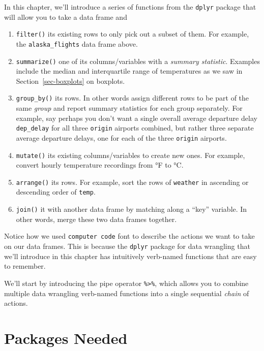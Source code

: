 \documentclass[
  letterpaper,
  DIV=11,
  numbers=noendperiod]{scrreprt}
\theoremstyle{definition}
\theoremstyle{remark}
\begin{document}
In this chapter, we'll introduce a series of functions from the
\texttt{dplyr} package that will allow you to take a data frame and

\begin{enumerate}
\def\labelenumi{\arabic{enumi}.}
\item
  \texttt{filter()} its existing rows to only pick out a subset of them.
  For example, the \texttt{alaska\_flights} data frame above.
\item
  \texttt{summarize()} one of its columns/variables with a \emph{summary
  statistic}. Examples include the median and interquartile range of
  temperatures as we saw in Section~\ref{sec-boxplots} on boxplots.
\item
  \texttt{group\_by()} its rows. In other words assign different rows to
  be part of the same \emph{group} and report summary statistics for
  each group separately. For example, say perhaps you don't want a
  single overall average departure delay \texttt{dep\_delay} for all
  three \texttt{origin} airports combined, but rather three separate
  average departure delays, one for each of the three \texttt{origin}
  airports.
\item
  \texttt{mutate()} its existing columns/variables to create new ones.
  For example, convert hourly temperature recordings from °F to °C.
\item
  \texttt{arrange()} its rows. For example, sort the rows of
  \texttt{weather} in ascending or descending order of \texttt{temp}.
\item
  \texttt{join()} it with another data frame by matching along a ``key''
  variable. In other words, merge these two data frames together.
\end{enumerate}

Notice how we used \texttt{computer\ code} font to describe the actions
we want to take on our data frames. This is because the \texttt{dplyr}
package for data wrangling that we'll introduce in this chapter has
intuitively verb-named functions that are easy to remember.

We'll start by introducing the pipe operator
\texttt{\%\textgreater{}\%}, which allows you to combine multiple data
wrangling verb-named functions into a single sequential \emph{chain} of
actions.

\hypertarget{packages-needed-1}{%
\section*{Packages Needed}\label{packages-needed-1}}
\end{document}
